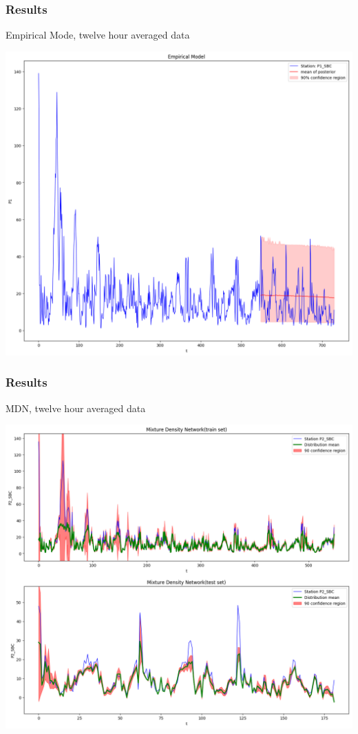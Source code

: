 \documentclass[18pt]{beamer}
\begin{document}
\begin{frame}
  \frametitle{Results}

  Empirical Mode, twelve hour averaged data
  \begin{center}
    \includegraphics[scale=0.25]{images/12h/emp-12h}
  \end{center}
  
\end{frame}

\begin{frame}
  \frametitle{Results}

  MDN, twelve hour averaged data
  \begin{center}
    \includegraphics[scale=0.25]{images/12h/mdn_12h}
  \end{center}
  
\end{frame}
\end{document}
